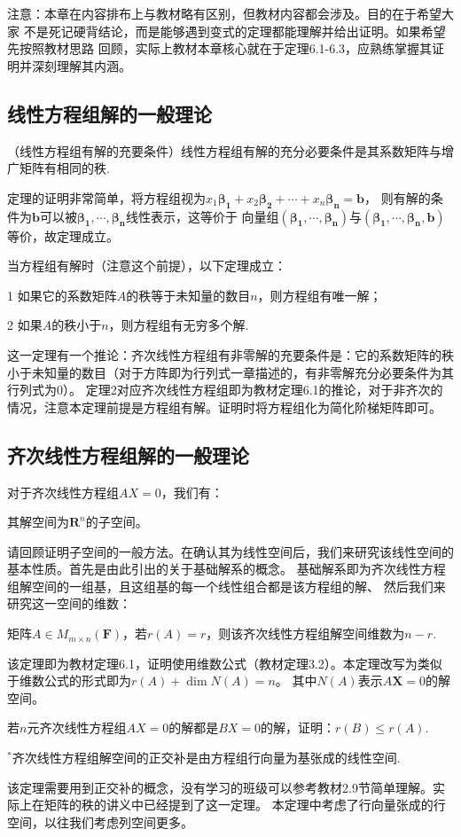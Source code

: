 注意：本章在内容排布上与教材略有区别，但教材内容都会涉及。目的在于希望大家
不是死记硬背结论，而是能够遇到变式的定理都能理解并给出证明。如果希望先按照教材思路
回顾，实际上教材本章核心就在于定理6.1-6.3，应熟练掌握其证明并深刻理解其内涵。
\subsection{线性方程组解的一般理论}
\begin{theorem}
	（线性方程组有解的充要条件）线性方程组有解的充分必要条件是其系数矩阵与增广矩阵有相同的秩.
\end{theorem}
定理的证明非常简单，将方程组视为$x_1\bm{\beta_1}+x_2\bm{\beta_2}+\cdots+x_n\bm{\beta_n}=\bm{b}$，
则有解的条件为$\bm{b}$可以被$\bm{\beta_1},\cdots,\bm{\beta_n}$线性表示，这等价于
向量组$(\bm{\beta_1},\cdots,\bm{\beta_n})$与$(\bm{\beta_1},\cdots,\bm{\beta_n},\bm{b})$等价，故定理成立。

\begin{theorem}
	当方程组有解时（注意这个前提），以下定理成立：

	\textup{1} 如果它的系数矩阵$A$的秩等于未知量的数目$n$，则方程组有唯一解；
	
	\textup{2} 如果$A$的秩小于$n$，则方程组有无穷多个解.
\end{theorem}
这一定理有一个推论：齐次线性方程组有非零解的充要条件是：它的系数矩阵的秩小于未知量的数目（对于方阵即为行列式一章描述的，有非零解充分必要条件为其行列式为0）。
定理2对应齐次线性方程组即为教材定理6.1的推论，对于非齐次的情况，注意本定理前提是方程组有解。证明时将方程组化为简化阶梯矩阵即可。
\subsection{齐次线性方程组解的一般理论}
对于齐次线性方程组$AX=0$，我们有：
\begin{theorem}
	其解空间为$\mathbf{R}^n$的子空间。
\end{theorem}
请回顾证明子空间的一般方法。在确认其为线性空间后，我们来研究该线性空间的基本性质。首先是由此引出的关于基础解系的概念。
基础解系即为齐次线性方程组解空间的一组基，且这组基的每一个线性组合都是该方程组的解、
然后我们来研究这一空间的维数：
\begin{theorem}
	矩阵$A \in M_{m \times n}(\mathbf{F})$，若$r(A) = r$，则该齐次线性方程组解空间维数为$n - r$.
\end{theorem}
该定理即为教材定理6.1，证明使用维数公式（教材定理3.2）。本定理改写为类似于维数公式的形式即为$r(A) + \dim N(A) = n$。
其中$N(A)$表示$A\bm{X}=0$的解空间。
\begin{example}
	若$n$元齐次线性方程组$AX = 0$的解都是$BX = 0$的解，证明：$r(B) \le r(A)$.
\end{example}
\begin{theorem}
	$^*$齐次线性方程组解空间的正交补是由方程组行向量为基张成的线性空间.
\end{theorem}
该定理需要用到正交补的概念，没有学习的班级可以参考教材2.9节简单理解。实际上在矩阵的秩的讲义中已经提到了这一定理。
本定理中考虑了行向量张成的行空间，以往我们考虑列空间更多。


